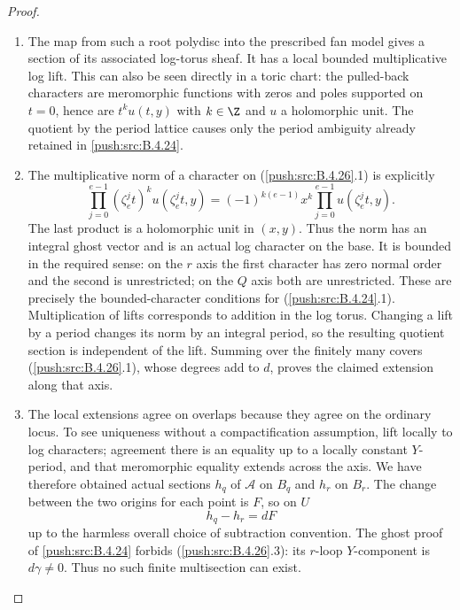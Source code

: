 \begin{proof}
\begin{enumerate}[label=\arabic*.,leftmargin=*]
\item The map from such a root polydisc into the
prescribed fan model gives a section of its
associated log-torus sheaf. It has a local bounded
multiplicative log lift. This can also be seen
directly in a toric chart: the pulled-back characters
are meromorphic functions with zeros and poles
supported on $t=0$, hence are $t^k u(t,y)$ with
$k\in\Z$ and $u$ a holomorphic unit. The quotient
by the period lattice causes only the period
ambiguity already retained in \ref{push:src:B.4.24}.

\item The multiplicative norm of a character on (\ref{push:src:B.4.26}.1)
is explicitly
\[
 \prod_{j=0}^{e-1}(\zeta_e^j t)^k
              u(\zeta_e^j t,y)
 =(-1)^{k(e-1)}x^k
              \prod_{j=0}^{e-1}u(\zeta_e^j t,y).
 \tag{B.4.26.2}
\]
The last product is a holomorphic unit in $(x,y)$.
Thus the norm has an integral ghost vector and
is an actual log character on the base. It is
bounded in the required sense: on the $r$ axis
the first character has zero normal order and
the second is unrestricted; on the $Q$ axis
both are unrestricted. These are precisely the
bounded-character conditions for (\ref{push:src:B.4.24}.1).
Multiplication of lifts corresponds to addition
in the log torus. Changing a lift by a period
changes its norm by an integral period, so the
resulting quotient section is independent of
the lift. Summing over the finitely many covers
(\ref{push:src:B.4.26}.1), whose degrees add to $d$, proves the
claimed extension along that axis.

\item The local extensions agree on overlaps because
they agree on the ordinary locus. To see uniqueness
without a compactification assumption, lift locally
to log characters; agreement there is an equality
up to a locally constant $Y$-period, and that
meromorphic equality extends across the axis.
We have therefore obtained actual sections
$h_q$ of $\mathcal A$ on $B_q$ and $h_r$ on
$B_r$. The change between the two origins for
each point is $F$, so on $U$
\[
 h_q-h_r=dF
 \tag{B.4.26.3}
\]
up to the harmless overall choice of subtraction
convention. The ghost proof of \ref{push:src:B.4.24} forbids
(\ref{push:src:B.4.26}.3): its $r$-loop $Y$-component is
$d\gamma\ne0$. Thus no such finite multisection
can exist.


\end{enumerate}
\end{proof}
